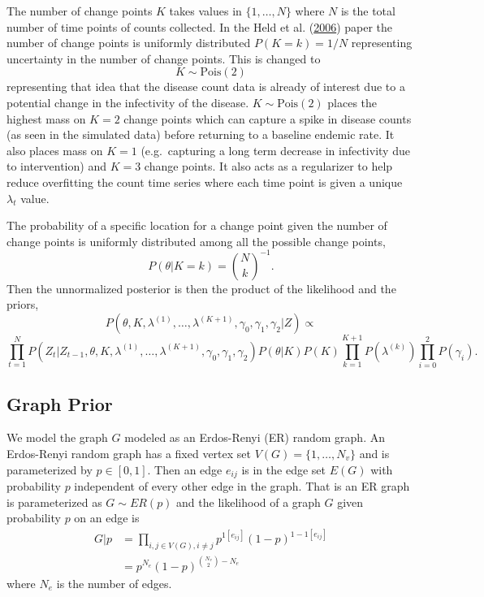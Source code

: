 \documentclass[11pt,a4paper]{article}
\begin{document}
The number of change points \(K\) takes values in \(\{1,\dots,N\}\)
where \(N\) is the total number of time points of counts collected. In
the Held et al. (\protect\hyperlink{ref-held_two-component_2006}{2006})
paper the number of change points is uniformly distributed
\(P(K = k) = 1/N\) representing uncertainty in the number of change
points. This is changed to \[K \sim \text{Pois}(2)\] representing that
idea that the disease count data is already of interest due to a
potential change in the infectivity of the disease.
\(K \sim\text{Pois}(2)\) places the highest mass on \(K = 2\) change
points which can capture a spike in disease counts (as seen in the
simulated data) before returning to a baseline endemic rate. It also
places mass on \(K = 1\) (e.g.~capturing a long term decrease in
infectivity due to intervention) and \(K = 3\) change points. It also
acts as a regularizer to help reduce overfitting the count time series
where each time point is given a unique \(\lambda_t\) value.

The probability of a specific location for a change point given the
number of change points is uniformly distributed among all the possible
change points, \[P(\theta|K=k) = \binom{N}{k}^{-1}.\] Then the
unnormalized posterior is then the product of the likelihood and the
priors,
\[ P(\theta, K, \lambda^{(1)}, \dots, \lambda^{(K+1)}, \gamma_0, \gamma_1, \gamma_2|Z)  \propto \]
\[\prod_{t=1}^N P(Z_t|Z_{t-1},\theta, K, \lambda^{(1)}, \dots, \lambda^{(K+1)}, \gamma_0, \gamma_1, \gamma_2)P(\theta|K)P(K)\prod_{k=1}^{K+1}P(\lambda^{(k)} )\prod_{i=0}^2P( \gamma_i)  .\]

\hypertarget{graph-prior}{%
\subsection{Graph Prior}\label{graph-prior}}

We model the graph \(G\) modeled as an Erdos-Renyi (ER) random graph. An
Erdos-Renyi random graph has a fixed vertex set
\(V(G) = \{1, \dots, N_v\}\) and is parameterized by \(p \in [0,1]\).
Then an edge \(e_{ij}\) is in the edge set \(E(G)\) with probability
\(p\) independent of every other edge in the graph. That is an ER graph
is parameterized as \(G \sim ER(p)\) and the likelihood of a graph \(G\)
given probability \(p\) on an edge is
\[\begin{aligned} G|p & = \prod_{i,j \in V(G),i \neq j} p^{1[e_{ij}]}(1-p)^{1-1[e_{ij}]} 
\\ & = p^{N_e}(1-p)^{\binom{N_v}{2}-N_e} \end{aligned}\] where \(N_e\)
is the number of edges.
\end{document}

